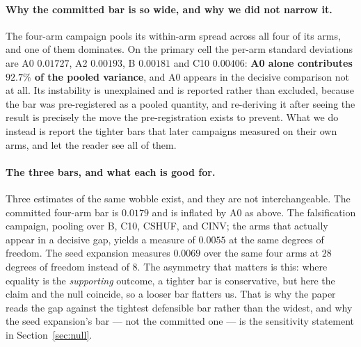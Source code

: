 \documentclass{article}
\begin{document}
\paragraph{Why the committed bar is so wide, and why we did not narrow it.} The four-arm campaign
pools its within-arm spread across all four of its arms, and one of them dominates. On the primary
cell the per-arm standard deviations are A0 $0.01727$, A2 $0.00193$, B $0.00181$ and C10 $0.00406$:
\textbf{A0 alone contributes $92.7\%$ of the pooled variance}, and A0 appears in the decisive
comparison not at all. Its instability is unexplained and is reported rather than excluded, because
the bar was pre-registered as a pooled quantity, and re-deriving it after seeing the result is
precisely the move the pre-registration exists to prevent. What we do instead is report the tighter
bars that later campaigns measured on their own arms, and let the reader see all of them.

\paragraph{The three bars, and what each is good for.} Three estimates of the same wobble exist,
and they are not interchangeable. The committed four-arm bar is $0.0179$ and is inflated by A0 as
above. The falsification campaign, pooling over B, C10, CSHUF, and CINV; the arms that actually appear in a decisive gap, yields a measure of $0.0055$ at the same degrees of freedom. The seed expansion
measures $0.0069$ over the same four arms at $28$ degrees of freedom instead of $8$. The asymmetry
that matters is this: where equality is the \emph{supporting} outcome, a tighter bar is
conservative, but here the claim and the null coincide, so a looser bar flatters us. That is why the
paper reads the gap against the tightest defensible bar rather than the widest, and why the seed
expansion's bar --- not the committed one --- is the sensitivity statement in Section~\ref{sec:null}.
\end{document}
